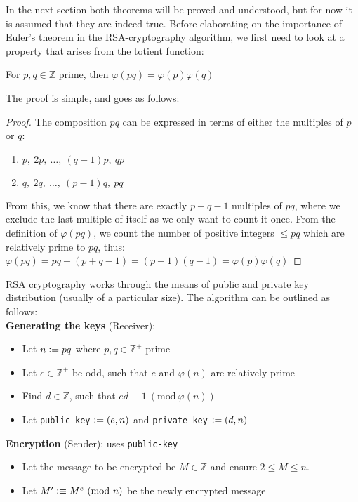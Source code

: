In the next section both theorems will be proved and understood, but for now it is assumed that they are indeed true. Before elaborating on the importance of Euler's theorem in the RSA-cryptography algorithm, we first need to look at a property that arises from the totient function:
\begin{proposition}
For $p,q \in \mathbb{Z}$ prime, then $\varphi(pq) = \varphi(p) \varphi(q)$
\end{proposition}
The proof is simple, and goes as follows:
\begin{proof}
The composition $pq$ can be expressed in terms of either the multiples of $p$ or $q$:
\begin{enumerate}[label = (\roman*)]
\item $p, \ 2p, \ \ldots, \ (q - 1)p, \ qp$
\item $q, \ 2q, \ \ldots, \ (p - 1)q, \ pq$
\end{enumerate}
From this, we know that there are exactly $p + q - 1$ multiples of $pq$, where we exclude the last multiple of itself as we only want to count it once. From the definition of $\varphi(pq)$, we count the number of positive integers $\leq pq$ which are relatively prime to $pq$, thus: \\
$\varphi(pq) = pq - (p + q - 1) = (p - 1)(q - 1) = \varphi(p) \varphi(q)$
\end{proof}
RSA cryptography works through the means of public and private key distribution (usually of a particular size). The algorithm can be outlined as follows: \\
\textbf{Generating the keys} (Receiver):
\begin{itemize}
\item Let $n \vcentcolon= pq$ where $p,q \in \mathbb{Z}^{+}$ prime
\item Let $e \in \mathbb{Z}^{+}$ be odd, such that $e$ and $\varphi(n)$ are relatively prime
\item Find $d \in \mathbb{Z}$, such that $ed \equiv 1~(\text{mod}~\varphi(n))$
\item Let \texttt{public-key} $\vcentcolon= (e, n)$ and \texttt{private-key} $\vcentcolon= (d, n)$
\end{itemize}
\textbf{Encryption} (Sender): uses \texttt{public-key}
\begin{itemize}
\item Let the message to be encrypted be $M \in \mathbb{Z}$ and ensure $2 \leq M \leq n$.
\item Let $M' \vcentcolon\equiv M^{e}~(\text{mod}~n)$ be the newly encrypted message
\end{itemize}
